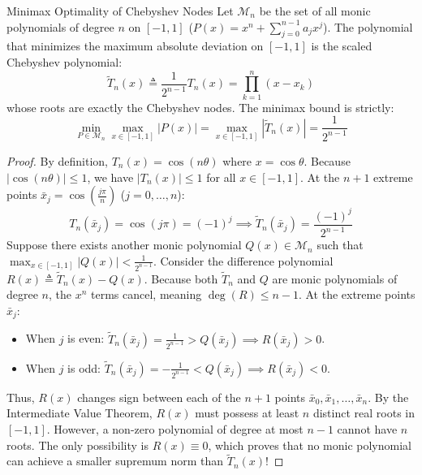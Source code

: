\begin{theorembox}{Minimax Optimality of Chebyshev Nodes}
\label{thm:chebyshev_minimax}
Let $\mathcal{M}_n$ be the set of all monic polynomials of degree $n$ on $[-1, 1]$ ($P(x) = x^n + \sum_{j=0}^{n-1} a_j x^j$). The polynomial that minimizes the maximum absolute deviation on $[-1, 1]$ is the scaled Chebyshev polynomial:
\begin{equation}
\tilde{T}_n(x) \triangleq \frac{1}{2^{n-1}} T_n(x) = \prod_{k=1}^n (x - x_k)
\end{equation}
whose roots are exactly the Chebyshev nodes. The minimax bound is strictly:
\begin{equation}
\min_{P \in \mathcal{M}_n} \max_{x \in [-1, 1]} |P(x)| = \max_{x \in [-1, 1]} |\tilde{T}_n(x)| = \frac{1}{2^{n-1}}
\label{eq:chebyshev_minimax_bound}
\end{equation}
\end{theorembox}

\begin{proof}
By definition, $T_n(x) = \cos(n \theta)$ where $x = \cos \theta$. Because $|\cos(n\theta)| \le 1$, we have $|T_n(x)| \le 1$ for all $x \in [-1, 1]$.
At the $n+1$ extreme points $\bar{x}_j = \cos\left(\frac{j\pi}{n}\right)$ ($j = 0, \dots, n$):
\begin{equation}
T_n(\bar{x}_j) = \cos(j\pi) = (-1)^j \implies \tilde{T}_n(\bar{x}_j) = \frac{(-1)^j}{2^{n-1}}
\end{equation}
Suppose there exists another monic polynomial $Q(x) \in \mathcal{M}_n$ such that $\max_{x \in [-1, 1]} |Q(x)| < \frac{1}{2^{n-1}}$.
Consider the difference polynomial $R(x) \triangleq \tilde{T}_n(x) - Q(x)$.
Because both $\tilde{T}_n$ and $Q$ are monic polynomials of degree $n$, the $x^n$ terms cancel, meaning $\deg(R) \le n - 1$.
At the extreme points $\bar{x}_j$:
\begin{itemize}
    \item When $j$ is even: $\tilde{T}_n(\bar{x}_j) = \frac{1}{2^{n-1}} > Q(\bar{x}_j) \implies R(\bar{x}_j) > 0$.
    \item When $j$ is odd: $\tilde{T}_n(\bar{x}_j) = -\frac{1}{2^{n-1}} < Q(\bar{x}_j) \implies R(\bar{x}_j) < 0$.
\end{itemize}
Thus, $R(x)$ changes sign between each of the $n+1$ points $\bar{x}_0, \bar{x}_1, \dots, \bar{x}_n$.
By the Intermediate Value Theorem, $R(x)$ must possess at least $n$ distinct real roots in $[-1, 1]$.
However, a non-zero polynomial of degree at most $n - 1$ cannot have $n$ roots. The only possibility is $R(x) \equiv 0$, which proves that no monic polynomial can achieve a smaller supremum norm than $\tilde{T}_n(x)$!
\end{proof}

